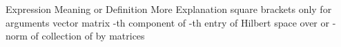 {\tfx
\starttable[|l|l|l|] \HL
\NC Expression \VL Meaning or Definition \VL More Explanation \SR \HL
\NC {} \VL square brackets \VL only for arguments \AR \HL
\NC {} \VL vector \VL  \AR \HL
\NC {} \VL matrix \VL  \AR \HL
\NC {} \VL {}-th component of  \VL  \AR \HL
\NC {} \VL {}-th entry of  \VL  \AR \HL
\NC {} \VL Hilbert space  over  \VL {} or  \AR \HL
\NC {} \VL {}-norm of  \VL {} \AR \HL
\NC {} \VL collection of  by  matrices \VL  \AR \HL
\stoptable
}


